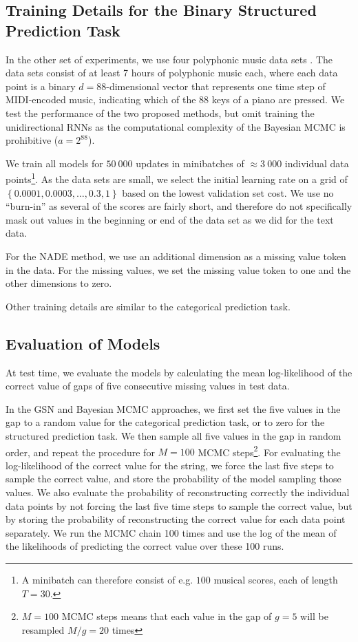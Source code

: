 \documentclass{article}
\begin{document}
\subsection{Training Details for the Binary Structured Prediction Task}

In the other set of experiments, we use four polyphonic music data sets 
\citep{boulanger2012modeling}. The data sets consist of at least 7 hours of polyphonic 
music each, where each data point is a binary $d=88$-dimensional vector that represents one 
time step of MIDI-encoded music, indicating which of the 88 keys of a piano are pressed.
We test the performance of the two proposed 
methods, but omit training the unidirectional RNNs as the computational complexity of the Bayesian MCMC is prohibitive ($a=2^{88}$).

We train all models for $50~000$ updates in minibatches of $\approx 3~000$ 
individual data points\footnote{A minibatch can therefore consist of e.g. $100$ 
musical scores, each of length $T=30$.}. As the data sets are small, we select the 
initial learning rate on a grid of $\left\lbrace 0.0001, 0.0003, \ldots, 0.3, 
1\right\rbrace$ based on the lowest validation set cost. We use no ``burn-in'' as 
several of the scores are fairly short, and therefore do not specifically mask 
out values in the beginning or end of the data set as we did for the text data.

For the NADE method, we use an additional dimension as a missing value token in 
the data. For the missing values, we set the missing value token to one and the 
other dimensions to zero.

Other training details are similar to the categorical prediction task.


\subsection{Evaluation of Models}
At test time, we evaluate the models by calculating the mean log-likelihood of the 
correct value of gaps of five consecutive missing values in test data.

In the GSN and Bayesian MCMC approaches, we first set the five values in the gap to a random value 
for the categorical prediction task, or to zero for the structured prediction task. We 
then sample all five values in the gap in random order, and repeat the procedure 
for $M=100$ MCMC steps\footnote{$M=100$ MCMC steps means that each value in the gap of $g=5$ will be resampled $M/g=20$ times}. For 
evaluating the log-likelihood of the correct value for the string, we force the 
last five steps to sample the correct value, and store the probability of the 
model sampling those values. We also evaluate the probability of reconstructing 
correctly the individual data points by not forcing the last five time steps to 
sample the correct value, but by storing the probability of reconstructing the 
correct value for each data point separately.
We run the MCMC chain 100 times and use the log of 
the mean of the likelihoods of predicting the correct value over these 100 runs.
\end{document}
